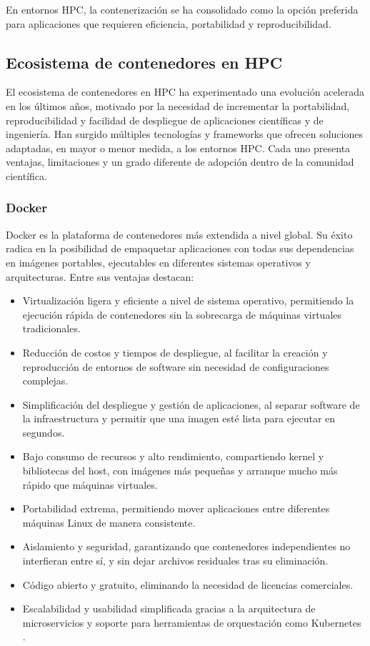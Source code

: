 En entornos HPC, la contenerización se ha consolidado como la opción preferida para aplicaciones que requieren eficiencia, portabilidad y reproducibilidad.

\subsection{Ecosistema de contenedores en HPC}\label{subsec:ecosistema_contenedores}

El ecosistema de contenedores en \acs{HPC} ha experimentado una evolución acelerada en los últimos años, motivado por la necesidad de incrementar la portabilidad, reproducibilidad y facilidad de despliegue de aplicaciones científicas y de ingeniería. Han surgido múltiples tecnologías y frameworks que ofrecen soluciones adaptadas, en mayor o menor medida, a los entornos HPC. Cada uno presenta ventajas, limitaciones y un grado diferente de adopción dentro de la comunidad científica.

\subsubsection{Docker}

Docker es la plataforma de contenedores más extendida a nivel global. Su éxito radica en la posibilidad de empaquetar aplicaciones con todas sus dependencias en imágenes portables, ejecutables en diferentes sistemas operativos y arquitecturas. Entre sus ventajas destacan:

\begin{itemize}
    \item Virtualización ligera y eficiente a nivel de sistema operativo, permitiendo la ejecución rápida de contenedores sin la sobrecarga de máquinas virtuales tradicionales.
    \item Reducción de costos y tiempos de despliegue, al facilitar la creación y reproducción de entornos de software sin necesidad de configuraciones complejas.
    \item Simplificación del despliegue y gestión de aplicaciones, al separar software de la infraestructura y permitir que una imagen esté lista para ejecutar en segundos.
    \item Bajo consumo de recursos y alto rendimiento, compartiendo kernel y bibliotecas del host, con imágenes más pequeñas y arranque mucho más rápido que máquinas virtuales.
    \item Portabilidad extrema, permitiendo mover aplicaciones entre diferentes máquinas Linux de manera consistente.
    \item Aislamiento y seguridad, garantizando que contenedores independientes no interfieran entre sí, y sin dejar archivos residuales tras su eliminación.
    \item Código abierto y gratuito, eliminando la necesidad de licencias comerciales.
    \item Escalabilidad y usabilidad simplificada gracias a la arquitectura de microservicios y soporte para herramientas de orquestación como Kubernetes \cite{Bhatia2017THERT}.
\end{itemize}

